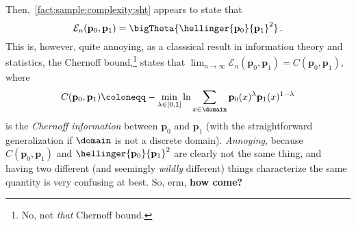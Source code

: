 \documentclass[10pt]{article}
\renewcommand{\eqdef}{\coloneqq}
\newcommand{\p}{\mathbf{p}}
\newcommand{\ns}{n}
\newcommand{\errexp}{\mathcal{E}}
\begin{document}
 Then,~\autoref{fact:sample:complexity:sht} appears to state that
\begin{equation}
	\label{eq:error:exp:hell}
\errexp_\ns(\p_0,\p_1) = \bigTheta{\hellinger{\p_0}{\p_1}^2}\,.
\end{equation}
This is, however, quite annoying, as a classsical result in information theory and statistics, the Chernoff bound,\footnote{No, not \emph{that} Chernoff bound.} states that $\lim_{\ns\to\infty} \errexp_\ns(\p_0,\p_1) = C(\p_0,\p_1)$, where 
\begin{equation}
	C(\p_0,\p_1) \eqdef - \min_{\lambda\in[0,1]}\ln \sum_{x\in\domain} \p_0(x)^\lambda \p_1(x)^{1-\lambda} 
\end{equation}
is the \emph{Chernoff information} between $\p_0$ and $\p_1$ (with the straightforward generalization if $\domain$ is not a discrete domain). \emph{Annoying}, because $C(\p_0,\p_1)$ and $\hellinger{\p_0}{\p_1}^2$ are clearly not the same thing, and having two different (and seemingly \emph{wildly} different) things characterize the same quantity is very confusing at best. So, erm, \textbf{how come?}
\end{document}
